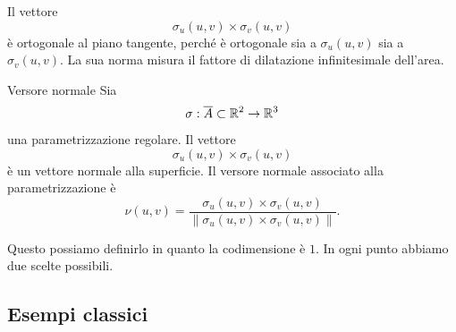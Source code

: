\documentclass[a4paper]{article}
\begin{document}
\begin{radioactive}
Il vettore
\[
    \sigma_u(u,v)\times\sigma_v(u,v)
\]
è ortogonale al piano tangente, perché è ortogonale sia a \(\sigma_u(u,v)\) sia a
\(\sigma_v(u,v)\). La sua norma misura il fattore di dilatazione infinitesimale dell'area.
\end{radioactive}

\begin{radioactive}
\begin{snippetdefinition}{Versore normale}
    Sia
    \[
        \sigma:\overline{A}\subset\mathbb{R}^2\to\mathbb{R}^3
    \]
    una parametrizzazione regolare. Il vettore
    \[
        \sigma_u(u,v)\times\sigma_v(u,v)
    \]
    è un vettore normale alla superficie. Il versore normale associato alla parametrizzazione è
    \[
        \nu(u,v)
        =
        \frac{\sigma_u(u,v)\times\sigma_v(u,v)}
        {\|\sigma_u(u,v)\times\sigma_v(u,v)\|}.
    \]
\end{snippetdefinition}
\end{radioactive}

\begin{radioactive}
Questo possiamo definirlo in quanto la codimensione è \(1\).
In ogni punto abbiamo due scelte possibili.
\end{radioactive}

\subsection{Esempi classici}
\end{document}

